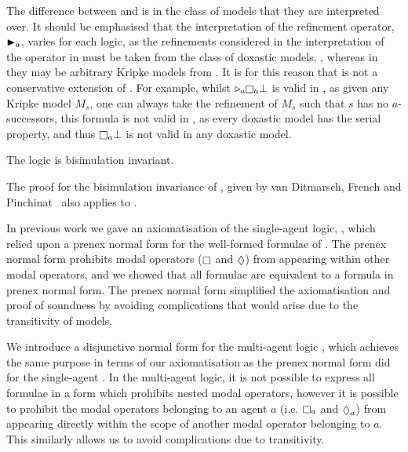 The difference between \logicKF{} and \logicKDF{} is in the class of models that
they are interpreted over. It should be emphasised that the interpretation of
the refinement operator, ${\mathopen{\blacktriangleright}}_a$, varies for each logic, as the refinements
considered in the interpretation of the operator in \logicKDF{} must be taken
from the class of doxastic models, \classKD{}, whereas in \logicKF{} they may be
arbitrary Kripke models from \classK{}. It is for this reason that \logicKDF{}
is not a conservative extension of \logicKF{}. For example, whilst $\somerefs_a
\knows_a \bot$ is valid in \logicKF{}, as given any Kripke model $M_s$, one can
always take the refinement of $M_s$ such that $s$ has no $a$-successors, this
formula is not valid in \logicKDF{}, as every doxastic model has the serial
property, and thus $\knows_a \bot$ is not valid in any doxastic model.

\begin{lemma}
The logic \logicKDF{} is bisimulation invariant.
\end{lemma}

The proof for the bisimulation invariance of \logicKF{}, given by van Ditmarsch,
French and Pinchinat~\cite{french2010future} also applies to \logicKDF{}.


In previous work we gave an axiomatisation of the single-agent logic,
\logicKDiF{}, which relied upon a prenex normal form for the well-formed
formulae of \logicKDi{}. The prenex normal form prohibits modal operators
($\knows$ and $\suspects$) from appearing within other modal operators, and we
showed that all \logicKDi{} formulae are equivalent to a formula in prenex
normal form. The prenex normal form simplified the axiomatisation and proof of
soundness by avoiding complications that would arise due to the transitivity of
\classKD{} models.

We introduce a disjunctive normal form for the multi-agent logic \logicKD{},
which achieves the same purpose in terms of our axiomatisation as the prenex
normal form did for the single-agent \logicKD{}. In the multi-agent logic, it is
not possible to express all formulae in a form which prohibits nested modal
operators, however it is possible to prohibit the modal operators belonging to
an agent $a$ (i.e. $\knows_a$ and $\suspects_a$) from appearing directly within
the scope of another modal operator belonging to $a$. This similarly allows us
to avoid complications due to transitivity.

